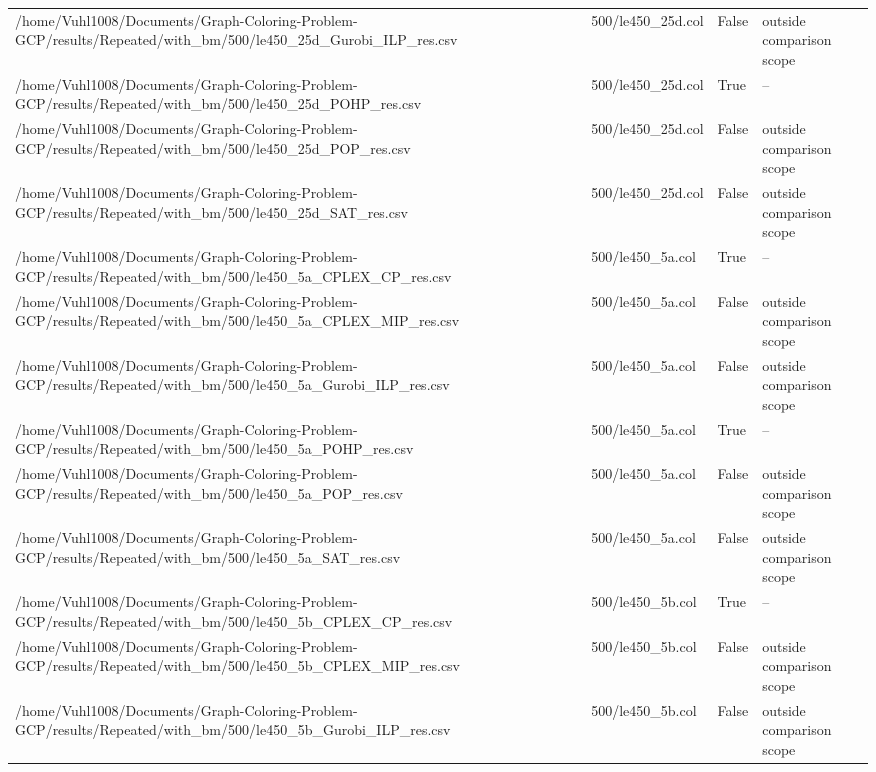 \begin{table}[htbp]
\begin{tabular}{llll}
/home/Vuhl1008/Documents/Graph-Coloring-Problem-GCP/results/Repeated/with\_bm/500/le450\_25d\_Gurobi\_ILP\_res.csv & 500/le450\_25d.col & False & outside comparison scope \\
/home/Vuhl1008/Documents/Graph-Coloring-Problem-GCP/results/Repeated/with\_bm/500/le450\_25d\_POHP\_res.csv & 500/le450\_25d.col & True & -- \\
/home/Vuhl1008/Documents/Graph-Coloring-Problem-GCP/results/Repeated/with\_bm/500/le450\_25d\_POP\_res.csv & 500/le450\_25d.col & False & outside comparison scope \\
/home/Vuhl1008/Documents/Graph-Coloring-Problem-GCP/results/Repeated/with\_bm/500/le450\_25d\_SAT\_res.csv & 500/le450\_25d.col & False & outside comparison scope \\
/home/Vuhl1008/Documents/Graph-Coloring-Problem-GCP/results/Repeated/with\_bm/500/le450\_5a\_CPLEX\_CP\_res.csv & 500/le450\_5a.col & True & -- \\
/home/Vuhl1008/Documents/Graph-Coloring-Problem-GCP/results/Repeated/with\_bm/500/le450\_5a\_CPLEX\_MIP\_res.csv & 500/le450\_5a.col & False & outside comparison scope \\
/home/Vuhl1008/Documents/Graph-Coloring-Problem-GCP/results/Repeated/with\_bm/500/le450\_5a\_Gurobi\_ILP\_res.csv & 500/le450\_5a.col & False & outside comparison scope \\
/home/Vuhl1008/Documents/Graph-Coloring-Problem-GCP/results/Repeated/with\_bm/500/le450\_5a\_POHP\_res.csv & 500/le450\_5a.col & True & -- \\
/home/Vuhl1008/Documents/Graph-Coloring-Problem-GCP/results/Repeated/with\_bm/500/le450\_5a\_POP\_res.csv & 500/le450\_5a.col & False & outside comparison scope \\
/home/Vuhl1008/Documents/Graph-Coloring-Problem-GCP/results/Repeated/with\_bm/500/le450\_5a\_SAT\_res.csv & 500/le450\_5a.col & False & outside comparison scope \\
/home/Vuhl1008/Documents/Graph-Coloring-Problem-GCP/results/Repeated/with\_bm/500/le450\_5b\_CPLEX\_CP\_res.csv & 500/le450\_5b.col & True & -- \\
/home/Vuhl1008/Documents/Graph-Coloring-Problem-GCP/results/Repeated/with\_bm/500/le450\_5b\_CPLEX\_MIP\_res.csv & 500/le450\_5b.col & False & outside comparison scope \\
/home/Vuhl1008/Documents/Graph-Coloring-Problem-GCP/results/Repeated/with\_bm/500/le450\_5b\_Gurobi\_ILP\_res.csv & 500/le450\_5b.col & False & outside comparison scope \\

\end{tabular}
\end{table}
